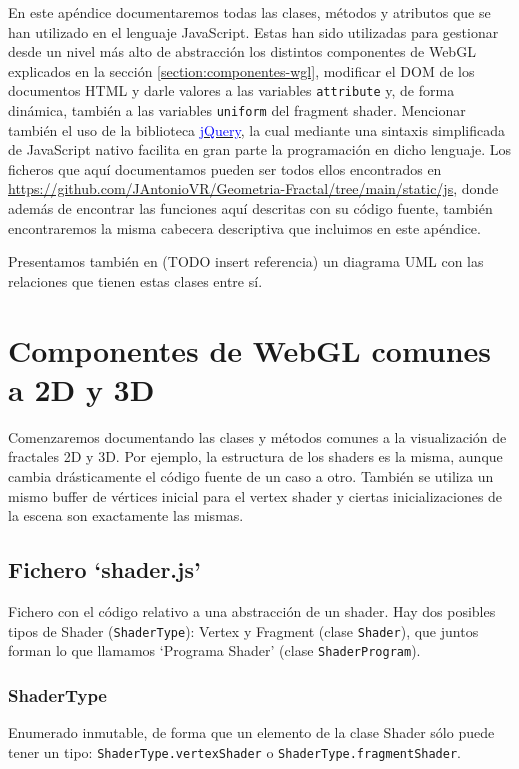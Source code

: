 En este apéndice documentaremos todas las clases, métodos y atributos que se han utilizado en el lenguaje JavaScript. Estas han sido utilizadas para gestionar desde un nivel más alto de abstracción los distintos componentes de WebGL explicados en la sección \ref{section:componentes-wgl}, modificar el DOM de los documentos HTML y darle valores a las variables \verb|attribute| y, de forma dinámica, también a las variables \verb|uniform| del fragment shader. Mencionar también el uso de la biblioteca \href{https://jquery.com/}{\textcolor{blue}{jQuery}}, la cual mediante una sintaxis simplificada de JavaScript nativo facilita en gran parte la programación en dicho lenguaje. Los ficheros que aquí documentamos pueden ser todos ellos encontrados en \url{https://github.com/JAntonioVR/Geometria-Fractal/tree/main/static/js}, donde además de encontrar las funciones aquí descritas con su código fuente, también encontraremos la misma cabecera descriptiva que incluimos en este apéndice.

Presentamos también en (TODO insert referencia) un diagrama UML con las relaciones que tienen estas clases entre sí.

\section{Componentes de WebGL comunes a 2D y 3D}

Comenzaremos documentando las clases y métodos comunes a la visualización de fractales 2D y 3D. Por ejemplo, la estructura de los shaders es la misma, aunque cambia drásticamente el código fuente de un caso a otro. También se utiliza un mismo buffer de vértices inicial para el vertex shader y ciertas inicializaciones de la escena son exactamente las mismas.

\subsection{Fichero `shader.js'}

Fichero con el código relativo a una abstracción de un shader. Hay dos posibles tipos de Shader (\verb|ShaderType|): Vertex y Fragment (clase \verb|Shader|), que juntos forman lo que llamamos `Programa Shader' (clase \verb|ShaderProgram|).

\subsubsection{ShaderType}

Enumerado inmutable, de forma que un elemento de la clase Shader sólo puede tener un tipo: \verb|ShaderType.vertexShader| o \verb|ShaderType.fragmentShader|.

